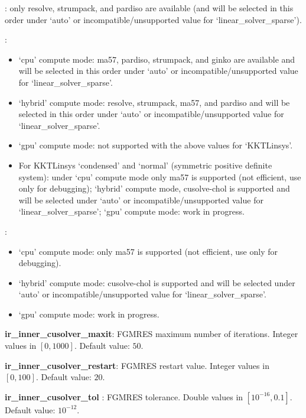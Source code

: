 : only resolve, strumpack, and pardiso are available (and will be selected in this order under `auto' or incompatible/unsupported value for `linear\_solver\_sparse').

: 
\begin{itemize}
  \item `cpu' compute mode: ma57, pardiso, strumpack, and ginko are available and will be selected in this order under `auto' or incompatible/unsupported value for `linear\_solver\_sparse'.
  \item `hybrid' compute mode: resolve, strumpack, ma57, and pardiso and will be selected in this order under `auto' or incompatible/unsupported value for `linear\_solver\_sparse'.
  \item `gpu' compute mode: not supported with the above values for `KKTLinsys'.
  \item For KKTLinsys `condensed' and `normal' (symmetric positive definite system): under `cpu' compute mode only ma57 is supported (not efficient, use only for debugging); `hybrid' compute mode, cusolve-chol is supported and will be selected under `auto' or incompatible/unsupported value for `linear\_solver\_sparse'; `gpu' compute mode: work in progress.
\end{itemize}

: 
\begin{itemize}
  \item `cpu' compute mode: only ma57 is supported (not efficient, use only for debugging).
  \item `hybrid' compute mode: cusolve-chol is supported and will be selected under `auto' or incompatible/unsupported value for `linear\_solver\_sparse'.
  \item `gpu' compute mode: work in progress.
\end{itemize}

\noindent \textbf{ir\_inner\_cusolver\_maxit}: FGMRES maximum number of iterations. Integer values in $[0, 1000]$. Default value: $50$.
\medskip

\noindent \textbf{ir\_inner\_cusolver\_restart}: FGMRES restart value. Integer values in $[0, 100]$. Default value: $20$.
\medskip

\noindent \textbf{ir\_inner\_cusolver\_tol }: FGMRES tolerance. Double values in $[10^{-16}, 0.1]$. Default value: $10^{-12}$.
\medskip

